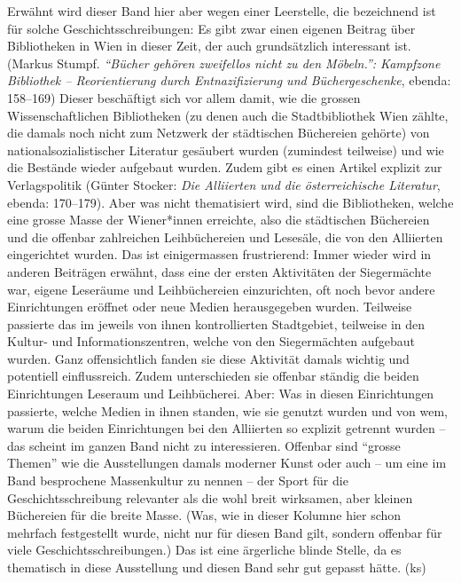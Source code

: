 \documentclass[a4paper,
fontsize=11pt,
oneside,
numbers=noperiodatend,
parskip=half-,
bibliography=totoc,
final
]{scrartcl}
\begin{document}
Erwähnt wird dieser Band hier aber wegen einer Leerstelle, die
bezeichnend ist für solche Geschichtsschreibungen: Es gibt zwar einen
eigenen Beitrag über Bibliotheken in Wien in dieser Zeit, der auch
grundsätzlich interessant ist. (Markus Stumpf. \emph{\enquote{Bücher
gehören zweifellos nicht zu den Möbeln.}: Kampfzone Bibliothek --
Reorientierung durch Entnazifizierung und Büchergeschenke}, ebenda:
158--169) Dieser beschäftigt sich vor allem damit, wie die grossen
Wissenschaftlichen Bibliotheken (zu denen auch die Stadtbibliothek Wien
zählte, die damals noch nicht zum Netzwerk der städtischen Büchereien
gehörte) von nationalsozialistischer Literatur gesäubert wurden
(zumindest teilweise) und wie die Bestände wieder aufgebaut wurden.
Zudem gibt es einen Artikel explizit zur Verlagspolitik (Günter Stocker:
\emph{Die Alliierten und die österreichische Literatur}, ebenda:
170--179). Aber was nicht thematisiert wird, sind die Bibliotheken,
welche eine grosse Masse der Wiener*innen erreichte, also die
städtischen Büchereien und die offenbar zahlreichen Leihbüchereien und
Lesesäle, die von den Alliierten eingerichtet wurden. Das ist
einigermassen frustrierend: Immer wieder wird in anderen Beiträgen
erwähnt, dass eine der ersten Aktivitäten der Siegermächte war, eigene
Leseräume und Leihbüchereien einzurichten, oft noch bevor andere
Einrichtungen eröffnet oder neue Medien herausgegeben wurden. Teilweise
passierte das im jeweils von ihnen kontrollierten Stadtgebiet, teilweise
in den Kultur- und Informationszentren, welche von den Siegermächten
aufgebaut wurden. Ganz offensichtlich fanden sie diese Aktivität damals
wichtig und potentiell einflussreich. Zudem unterschieden sie offenbar
ständig die beiden Einrichtungen Leseraum und Leihbücherei. Aber: Was in
diesen Einrichtungen passierte, welche Medien in ihnen standen, wie sie
genutzt wurden und von wem, warum die beiden Einrichtungen bei den
Alliierten so explizit getrennt wurden -- das scheint im ganzen Band
nicht zu interessieren. Offenbar sind \enquote{grosse Themen} wie die
Ausstellungen damals moderner Kunst oder auch -- um eine im Band
besprochene Massenkultur zu nennen -- der Sport für die
Geschichtsschreibung relevanter als die wohl breit wirksamen, aber
kleinen Büchereien für die breite Masse. (Was, wie in dieser Kolumne
hier schon mehrfach festgestellt wurde, nicht nur für diesen Band gilt,
sondern offenbar für viele Geschichtsschreibungen.) Das ist eine
ärgerliche blinde Stelle, da es thematisch in diese Ausstellung und
diesen Band sehr gut gepasst hätte. (ks)
\end{document}
